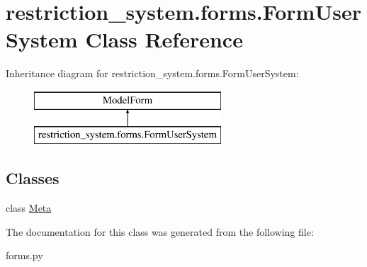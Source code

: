 \hypertarget{classrestriction__system_1_1forms_1_1FormUserSystem}{}\section{restriction\+\_\+system.\+forms.\+Form\+User\+System Class Reference}
\label{classrestriction__system_1_1forms_1_1FormUserSystem}
Inheritance diagram for restriction\+\_\+system.\+forms.\+Form\+User\+System\+:\begin{figure}[H]
\begin{center}
\leavevmode
\includegraphics[height=2.000000cm]{classrestriction__system_1_1forms_1_1FormUserSystem}
\end{center}
\end{figure}
\subsection*{Classes}
\begin{DoxyCompactItemize}
\item 
class \hyperlink{classrestriction__system_1_1forms_1_1FormUserSystem_1_1Meta}{Meta}
\end{DoxyCompactItemize}


The documentation for this class was generated from the following file\+:\begin{DoxyCompactItemize}
\item 
forms.\+py\end{DoxyCompactItemize}
